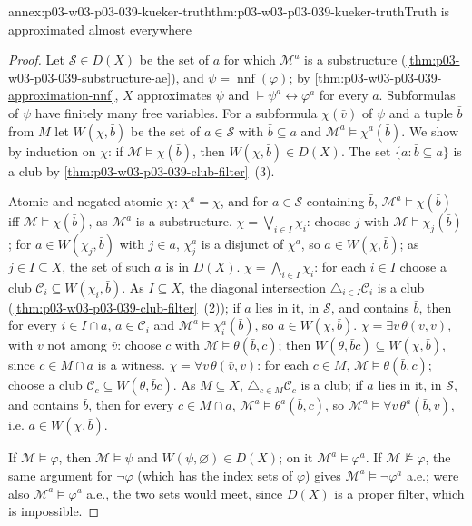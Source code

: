 \begin{annexitem}{annex:p03-w03-p03-039-kueker-truth}{thm:p03-w03-p03-039-kueker-truth}{Truth is approximated almost everywhere}
\begin{proof}
Let \(\mathcal S\in D(X)\) be the set of \(a\) for which \(\mathcal M^a\) is a
substructure (\cref{thm:p03-w03-p03-039-substructure-ae}), and
\(\psi=\operatorname{nnf}(\varphi)\); by
\cref{thm:p03-w03-p03-039-approximation-nnf}, \(X\) approximates \(\psi\) and
\(\models\psi^a\leftrightarrow\varphi^a\) for every \(a\). Subformulas of
\(\psi\) have finitely many free variables. For a subformula \(\chi(\bar v)\)
of \(\psi\) and a tuple \(\bar b\) from \(M\) let \(W(\chi,\bar b)\) be the
set of \(a\in\mathcal S\) with \(\bar b\subseteq a\) and
\(\mathcal M^a\models\chi^a(\bar b)\). We show by induction on \(\chi\): if
\(\mathcal M\models\chi(\bar b)\), then \(W(\chi,\bar b)\in D(X)\). The set
\(\{a:\bar b\subseteq a\}\) is a club by
\cref{thm:p03-w03-p03-039-club-filter}~(3).

Atomic and negated atomic \(\chi\): \(\chi^a=\chi\), and for
\(a\in\mathcal S\) containing \(\bar b\), \(\mathcal M^a\models\chi(\bar b)\)
iff \(\mathcal M\models\chi(\bar b)\), as \(\mathcal M^a\) is a substructure.
\(\chi=\bigvee_{i\in I}\chi_i\): choose \(j\) with
\(\mathcal M\models\chi_j(\bar b)\); for \(a\in W(\chi_j,\bar b)\) with
\(j\in a\), \(\chi_j^a\) is a disjunct of \(\chi^a\), so
\(a\in W(\chi,\bar b)\); as \(j\in I\subseteq X\), the set of such \(a\) is
in \(D(X)\). \(\chi=\bigwedge_{i\in I}\chi_i\): for each \(i\in I\) choose a
club \(\mathcal C_i\subseteq W(\chi_i,\bar b)\). As \(I\subseteq X\), the
diagonal intersection \(\triangle_{i\in I}\mathcal C_i\) is a club
(\cref{thm:p03-w03-p03-039-club-filter}~(2)); if \(a\) lies in it, in
\(\mathcal S\), and contains \(\bar b\), then for every \(i\in I\cap a\),
\(a\in\mathcal C_i\) and \(\mathcal M^a\models\chi_i^a(\bar b)\), so
\(a\in W(\chi,\bar b)\). \(\chi=\exists v\,\theta(\bar v,v)\), with \(v\) not
among \(\bar v\): choose \(c\) with \(\mathcal M\models\theta(\bar b,c)\);
then \(W(\theta,\bar bc)\subseteq W(\chi,\bar b)\), since \(c\in M\cap a\) is
a witness. \(\chi=\forall v\,\theta(\bar v,v)\): for each \(c\in M\),
\(\mathcal M\models\theta(\bar b,c)\); choose a club
\(\mathcal C_c\subseteq W(\theta,\bar bc)\). As \(M\subseteq X\),
\(\triangle_{c\in M}\mathcal C_c\) is a club; if \(a\) lies in it, in
\(\mathcal S\), and contains \(\bar b\), then for every \(c\in M\cap a\),
\(\mathcal M^a\models\theta^a(\bar b,c)\), so
\(\mathcal M^a\models\forall v\,\theta^a(\bar b,v)\), i.e.
\(a\in W(\chi,\bar b)\).

If \(\mathcal M\models\varphi\), then \(\mathcal M\models\psi\) and
\(W(\psi,\varnothing)\in D(X)\); on it \(\mathcal M^a\models\varphi^a\). If
\(\mathcal M\not\models\varphi\), the same argument for \(\neg\varphi\)
(which has the index sets of \(\varphi\)) gives
\(\mathcal M^a\models\neg\varphi^a\) a.e.; were also
\(\mathcal M^a\models\varphi^a\) a.e., the two sets would meet, since
\(D(X)\) is a proper filter, which is impossible.
\end{proof}
\end{annexitem}

